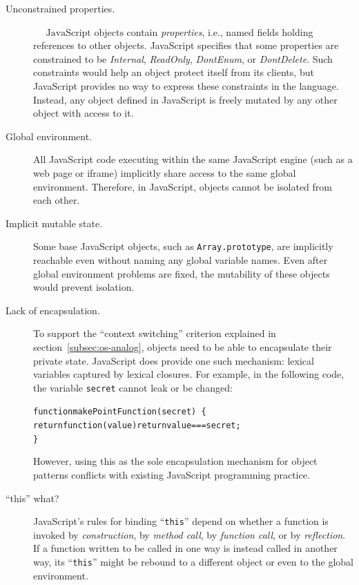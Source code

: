 \documentclass[letterpaper,twocolumn,10pt]{article}
\newcommand{\code}[1]{{\tt {#1}}}              %
\begin{document}
\begin{description}

  \item[Unconstrained properties.] $\mbox{~~~~JavaScript objects}$ contain 
  \emph{properties}, i.e., named fields holding references to other objects. 
  JavaScript specifies that some properties are constrained to be 
  \emph{Internal}, \emph{ReadOnly}, \emph{DontEnum}, or \emph{DontDelete}. 
  Such constraints would help an object protect itself from its clients, but 
  JavaScript provides no way to express these constraints in the language. 
  Instead, any object defined in JavaScript is freely mutated by any other 
  object with access to it.
  
  \item[Global environment.] All JavaScript code executing within the same 
  JavaScript engine (such as a web page or iframe) implicitly share access to 
  the same global environment. Therefore, in JavaScript, objects cannot be 
  isolated from each other.

  \item[Implicit mutable state.] Some base JavaScript objects, such as 
  \code{Array.prototype}, are implicitly reachable even without naming any 
  global variable names. Even after global environment problems are fixed, 
  the mutability of these objects would prevent isolation.

  \item[Lack of encapsulation.] To support the ``context switching'' 
  criterion explained in section~\ref{subsec:os-analog}, objects need 
  to be able to encapsulate their private state. JavaScript does provide 
  one such mechanism: lexical variables captured by lexical closures. 
  For example, in the following code, the variable \code{secret} cannot
  leak or be changed:
\begin{alltt}
function makePointFunction(secret)\ \{
  return function(value) { return value === secret; }
\}  
\end{alltt}
  However, using this as the sole 
  encapsulation mechanism for object patterns conflicts with existing 
  JavaScript programming practice.

  \item[``this'' what?] JavaScript's rules for binding ``\code{this}'' depend 
  on whether a function is invoked by \emph{construction}, by \emph{method 
  call}, by \emph{function call}, or by \emph{reflection}. If a function 
  written to be called in one way is instead called in another way, its 
  ``\code{this}'' might be rebound to a different object or even to the 
  global environment.


\end{description}
\end{document}
